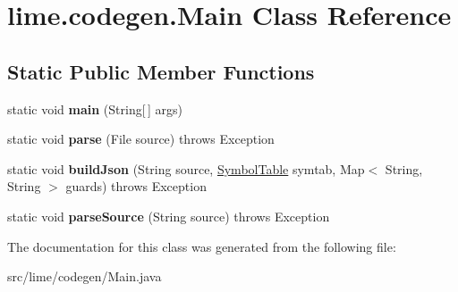 \hypertarget{classlime_1_1codegen_1_1Main}{}\section{lime.\+codegen.\+Main Class Reference}
\label{classlime_1_1codegen_1_1Main}
\subsection*{Static Public Member Functions}
\begin{DoxyCompactItemize}
\item 
\mbox{\label{classlime_1_1codegen_1_1Main_a7421c72e083e2b61d4a814c0c36fa7b2}} 
static void {\bfseries main} (String\mbox{[}$\,$\mbox{]} args)
\item 
\mbox{\label{classlime_1_1codegen_1_1Main_a34f35af613bde366a5efc1bf897fb441}} 
static void {\bfseries parse} (File source)  throws Exception         
\item 
\mbox{\label{classlime_1_1codegen_1_1Main_a51aa1aff40745622bddb428991e5cdec}} 
static void {\bfseries build\+Json} (String source, \hyperlink{classlime_1_1antlr4_1_1SymbolTable}{Symbol\+Table} symtab, Map$<$ String, String $>$ guards)  throws Exception
\item 
\mbox{\label{classlime_1_1codegen_1_1Main_ae1563b2445c300d15920f50364f2d363}} 
static void {\bfseries parse\+Source} (String source)  throws Exception         
\end{DoxyCompactItemize}


The documentation for this class was generated from the following file\+:\begin{DoxyCompactItemize}
\item 
src/lime/codegen/Main.\+java\end{DoxyCompactItemize}
